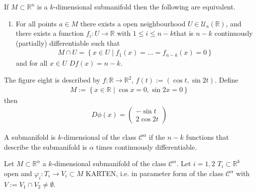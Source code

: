%
\begin{theorem}
    If \(M \subset \mathbb{R}^n\) is a \(k\)-dimensional submanifold then the following are equivalent.
    \begin{enumerate}
        \item For all points \(a \in M\) there exists a open neighbourhood \(U \in \mathcal{U}_a(\mathbb{R})\), and there exists a function \(f_i: U \rightarrow \mathbb{R}\) with \(1 \leq i \leq n-k\)that is \(n-k\) continuously (partially) differentiable such that
        \begin{align}
            M \cap U = \left\{ x \in U \middle| f_1(x) = \dots = f_{n-k}(x) = 0 \right\}
        \end{align}
        and for all \(x \in U\) \(Df (x) = n-k\).
    \end{enumerate}
\end{theorem}
%
\begin{example}
    The figure eight is described by \(f: \mathbb{R} \rightarrow \mathbb{R}^2\), \(f(t):= (\cos t, \sin 2t)\). Define
    \begin{align}
        M := \left\{ x \in \mathbb{R} \middle | \cos x = 0, \sin 2x = 0 \right\}
    \end{align}
    then
    \begin{align}
        D\phi(x) = \begin{pmatrix}
            -\sin t \\
            2\cos 2t
        \end{pmatrix}
    \end{align}
\end{example}
%
\begin{definition}
    A submanifold is \(k\)-dimensional of the class \(\mathcal{C}^\alpha\) if the \(n-k\) functions that describe the submanifold is \(\alpha\) times continuously differentiable.
\end{definition}
%
\begin{theorem}
    Let \(M \subset \mathbb{R}^n\) a \(k\)-dimensional submanifold of the class \(\mathcal{C}^\alpha\). Let \(i = 1, 2\) \(T_i \subset \mathbb{R}^k\) open and \(\varphi_i: T_i \rightarrow V_i \subset M\) KARTEN, i.e. in parameter form of the class \(\mathcal{C}^\alpha\) with \(V:= V_1 \cap V_2 \neq \emptyset\).
\end{theorem}